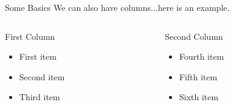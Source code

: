 \documentclass{beamer}  %
\begin{document}
\begin{frame}{Some Basics}
 We can also have columns...here is an example. 


\begin{columns} %
  
 \begin{column}{0.50\textwidth} %
  \begin{block}{First Column} %
   \begin{itemize}
     \item First item
     \item Second item
     \item Third item
   \end{itemize}
  \end{block}
 \end{column}

 \begin{column}{0.50\textwidth} %
  \begin{block}{Second Column}
   \begin{itemize}
    \item Fourth item
    \item Fifth item
    \item Sixth item
   \end{itemize}
  \end{block}
 \end{column}

\end{columns}

\end{frame}
\end{document}
